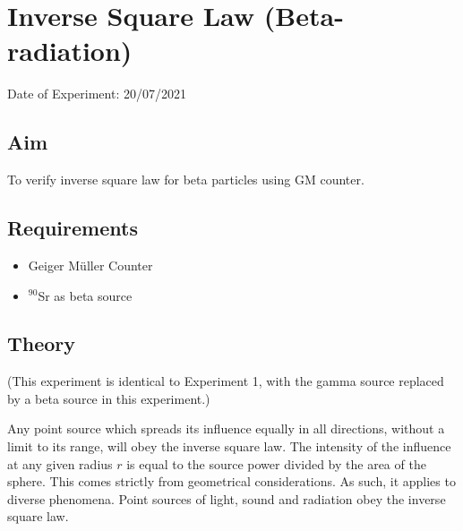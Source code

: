 


	
	\chapter{Inverse Square Law (Beta-radiation)} %
	\vspace{-1cm}
	
	\begin{center}%
		Date of Experiment: 20/07/2021
	\end{center}
	
	
	\section{Aim}
	To verify inverse square law for beta particles using GM counter. 
	\section{Requirements}
	\begin{itemize}
		\item 	Geiger M{\"u}ller Counter
		\item 	$ ^{90} $Sr as beta source
	\end{itemize}
	
	\section{Theory}
	(This experiment is identical to Experiment 1, with the gamma source replaced by a beta source in this experiment.)
	
	Any point source which spreads its influence equally in all directions, without a limit to its range, will obey the inverse square law. The intensity of the influence at any given radius $ r $ is equal to the source power divided by the area of the sphere. This comes strictly from geometrical considerations. As such, it applies to diverse phenomena. Point sources of light, sound and radiation obey the inverse square law.
	
